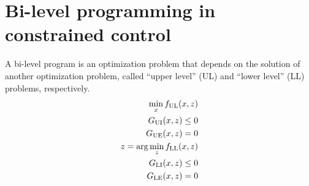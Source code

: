 \section{Bi-level programming in constrained control}
A bi-level program is an optimization problem that depends on the solution of another optimization problem, called ``upper level'' (UL) and ``lower level'' (LL) problems, respectively.
%
\begin{equation}\label{eq:bilevel-general}
  \begin{split}
    \min_x f_\mathrm{UL}(x,z) \\
    G_\mathrm{UI}(x,z) \leq 0 \\
    G_\mathrm{UE}(x,z) = 0 \\
    z = \arg \min_z f_\mathrm{LL}(x,z) \\
    G_\mathrm{LI}(x,z) \leq 0 \\
    G_\mathrm{LE}(x,z) = 0
  \end{split}
\end{equation}

